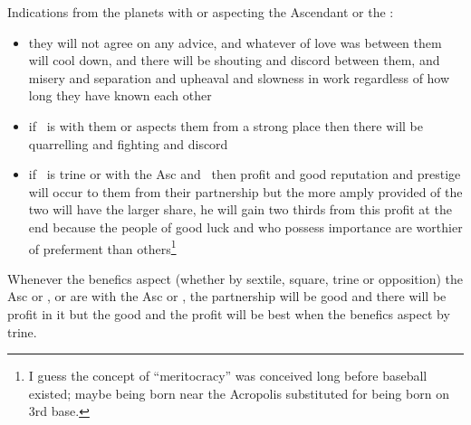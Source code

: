 Indications from the planets with or aspecting the Ascendant or the \Moon:
\begin{itemize}[topsep=0em,itemsep=0em]
\item[\Saturn] they will not agree on any advice, and whatever of love was between them will cool down, and there will be shouting and discord between them, and misery and separation and upheaval and slowness in work regardless of how long they have known each other
\item[\Mars] if \Mars\, is with them or aspects them from a strong place then there will be quarrelling and fighting and discord
\item[\Jupiter] if \Jupiter\, is trine or with the Asc and \Moon\, then profit and good reputation and prestige will occur to them from their partnership but the more amply provided of the two will have the larger share, he will gain two thirds from this profit at the end because the people of good luck and who possess importance are worthier of preferment than others\footnote{I guess the concept of ``meritocracy'' was conceived long before baseball existed; maybe being born near the Acropolis substituted for being born on 3rd base.}
\end{itemize}

Whenever the benefics aspect (whether by sextile, square, trine or opposition) the Asc or \Moon, or are with the Asc or \Moon, the partnership will be good and there will be profit in it but the good and the profit will be best when the benefics aspect by trine.